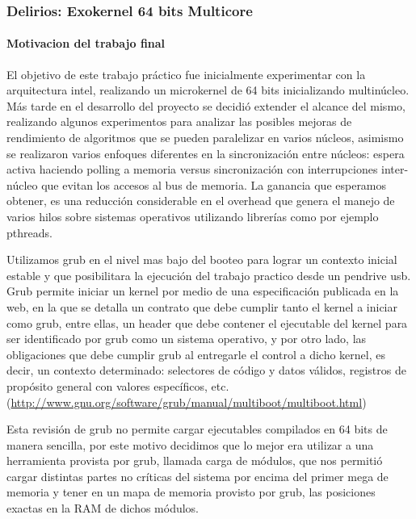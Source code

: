 \documentclass{beamer}
\begin{document}
  \begin{frame}
    \frametitle{Delirios: Exokernel 64 bits Multicore}    
    \framesubtitle{Motivacion del trabajo final}
    El objetivo de este trabajo práctico fue inicialmente experimentar con la arquitectura intel, realizando un microkernel de 64 bits inicializando multinúcleo. Más tarde en el desarrollo del proyecto se decidió extender el alcance del mismo, realizando algunos experimentos para analizar las posibles mejoras de rendimiento de algoritmos que se pueden paralelizar en varios núcleos, asimismo se realizaron varios enfoques diferentes en la sincronización entre núcleos: espera activa haciendo polling a memoria versus sincronización con interrupciones inter-núcleo que evitan los accesos al bus de memoria. La ganancia que esperamos obtener, es una reducción considerable en el overhead que genera el manejo de varios hilos sobre sistemas operativos utilizando librerías como por ejemplo pthreads.
  \end{frame}

  \begin{frame}
  	Utilizamos grub en el nivel mas bajo del booteo para lograr un contexto inicial estable y que posibilitara la ejecución del trabajo practico desde un pendrive usb.\\

	Grub permite iniciar un kernel por medio de una especificación publicada en la web, en la que se detalla un contrato que debe cumplir tanto el kernel a iniciar como grub, entre ellas, un header que debe contener el ejecutable del kernel para ser identificado por grub como un sistema operativo, y por otro lado, las obligaciones que debe cumplir grub al entregarle el control a dicho kernel, es decir, un contexto determinado: selectores de código y datos válidos, registros de propósito general con valores específicos, etc.\\
	(\url{http://www.gnu.org/software/grub/manual/multiboot/multiboot.html})\\
	
  \end{frame}


	\begin{frame}
	Esta revisión de grub no permite cargar ejecutables compilados en 64 bits de manera sencilla, por este motivo decidimos que lo mejor era utilizar a una herramienta provista por grub, llamada carga de módulos, que nos permitió cargar distintas partes no críticas del sistema por encima del primer mega de memoria y tener en un mapa de memoria provisto por grub, las posiciones exactas en la RAM de dichos módulos.\\ 
	\end{frame}
\end{document}

